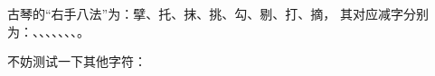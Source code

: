 \documentclass[a4paper]{ctexart}
\begin{document}
古琴的“右手八法”为：擘、托、抹、挑、勾、剔、打、摘，
其对应减字分别为：、、、、、、、。


不妨测试一下其他字符：
\end{document}
